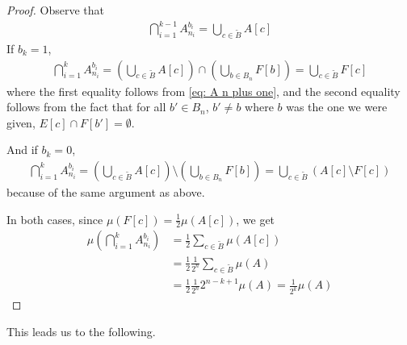 \begin{proof}
Observe that
\begin{align*}
	\bigcap_{i=1}^{k-1} A_{n_{i}}^{b_{i}} = \bigcup_{c\in \tilde{B}} A[c]
\end{align*}
If $b_{k}=1$,
\begin{align*}
	\bigcap_{i=1}^{k} A_{n_{i}}^{b_{i}} = \left( \bigcup_{c\in \tilde{B}} A[c] \right) \cap \left( \bigcup_{b\in B_{n}}F[b] \right) = \bigcup_{c\in \tilde{B}} F[c]
\end{align*}
where the first equality follows from \eqref{eq: A n plus one}, and the second equality follows from the fact that for all $b' \in B_{n}$, $b' \neq b$ where $b$ was the one we were given, $E[c] \cap F[b']=\emptyset$.

And if $b_{k}=0$,
\begin{align*}
	\bigcap_{i=1}^{k} A_{n_{i}}^{b_{i}} = \left( \bigcup_{c\in \tilde{B}} A[c] \right) \setminus \left( \bigcup_{b\in B_{n}}F[b] \right) = \bigcup_{c\in \tilde{B}} (A[c] \setminus F[c])
\end{align*}
because of the same argument as above.

In both cases, since $\mu(F[c])=\frac{1}{2}\mu(A[c])$, we get
\begin{align*}
	\mu\left( \bigcap_{i=1}^{k} A_{n_{i}}^{b_{i}} \right) &= \frac{1}{2} \sum_{c\in \tilde{B}} \mu(A[c]) \\
	&=\frac{1}{2}\frac{1}{2^{n}} \sum_{c\in \tilde{B}} \mu(A) \\
	&= \frac{1}{2}\frac{1}{2^{n}}2^{n-k+1}\mu(A)=\frac{1}{2^{k}}\mu(A)
\end{align*}
\end{proof}

This leads us to the following.


